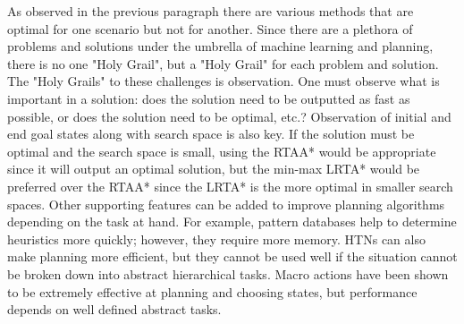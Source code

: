 \documentclass[tog]{acmsiggraph}
\begin{document}
\indent As observed in the previous paragraph there are various methods that are optimal for one scenario but not for another. Since there are a plethora of problems and solutions under the umbrella of machine learning and planning, there is no one "Holy Grail", but a "Holy Grail" for each problem and solution. The "Holy Grails" to these challenges is observation. One must observe what is important in a solution: does the solution need to be outputted as fast as possible, or does the solution need to be optimal, etc.? Observation of initial and end goal states along with search space is also key. If the solution must be optimal and the search space is small, using the RTAA* would be appropriate since it will output an optimal solution, but the min-max LRTA* would be preferred over the RTAA* since the LRTA* is the more optimal in smaller search spaces. Other supporting features can be added to improve planning algorithms depending on the task at hand. For example, pattern databases help to determine heuristics more quickly; however, they require more memory. HTNs can also make planning more efficient, but they cannot be used well if the situation cannot be broken down into abstract hierarchical tasks. Macro actions have been shown to be extremely effective at planning and choosing states, but performance depends on well defined abstract tasks.
\end{document}
